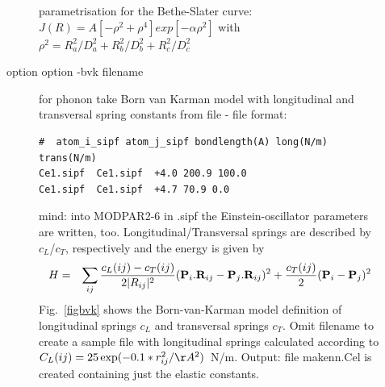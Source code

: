 \begin{description}
\begin{description}
parametrisation for the Bethe-Slater
                               curve: $J(R)= A [-\rho^2+\rho^4]exp[-\alpha \rho^2]$  with %
$\rho^2=R_a^2/D_a^2+R_b^2/D_b^2+R_c^2/D_c^2$
\item[option {\prg option -bvk filename}]
              for phonon take Born van Karman model with longitudinal and
              transversal spring constants from file - file format:
             \begin{verbatim}#  atom_i_sipf atom_j_sipf bondlength(A) long(N/m) trans(N/m) 
Ce1.sipf  Ce1.sipf  +4.0 200.9 100.0
Ce1.sipf  Ce1.sipf  +4.7 70.9 0.0
             \end{verbatim}
              mind: into MODPAR2-6 in {\prg *.sipf} the Einstein-oscillator parameters
              are written, too.
              Longitudinal/Transversal springs are described by $c_L$/$c_T$, respectively and
              the energy is given by
\begin{eqnarray}
 H &=& \sum_{ij} \frac{c_L(ij)-c_T(ij)}{2|\mbf \mbf R_{ij}|^2} (\mbf P_i . \mbf R_{ij}- \mbf P_j . \mbf R_{ij})^2 
       + \frac{c_T(ij)}{2} (\mbf P_i - \mbf P_j )^2 
\end{eqnarray}
Fig.~\ref{figbvk} shows the Born-van-Karman
model definition of longitudinal springs $c_L$ and transversal
springs $c_T$.
               Omit filename to create a sample file with
              longitudinal springs calculated according to $C_L(ij)=25 \exp(-0.1*r^2_{ij}/\AA^2)$~N/m.
	      Output: file {\prg makenn.Cel} is created containing just the elastic constants.


\end{description}
\end{description}
